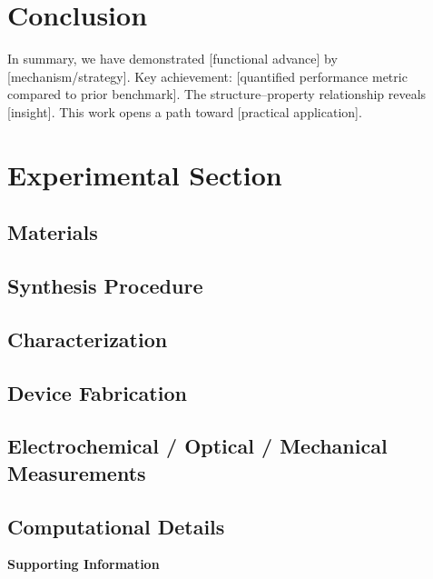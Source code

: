 \documentclass[12pt]{article}
\begin{document}
\section{Conclusion}

In summary, we have demonstrated [functional advance] by [mechanism/strategy].
Key achievement: [quantified performance metric compared to prior benchmark].
The structure–property relationship reveals [insight].
This work opens a path toward [practical application].

\section{Experimental Section}

\subsection{Materials}

\subsection{Synthesis Procedure}

\subsection{Characterization}

\subsection{Device Fabrication}

\subsection{Electrochemical / Optical / Mechanical Measurements}

\subsection{Computational Details}

\noindent\textbf{Supporting Information}
\end{document}
